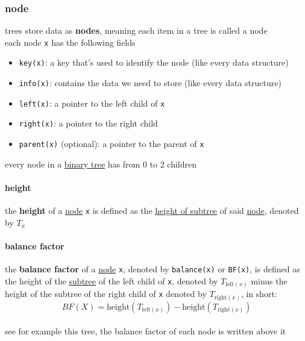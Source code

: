 \documentclass[a4paper,12pt]{article}
\begin{document}
\subsubsection{node}
\label{sec:orgec4976f}
trees store data as \textbf{nodes}, meaning each item in a tree is called a node\\[0pt]
each node \texttt{x} has the following fields\\[0pt]

\begin{itemize}
\item \texttt{key(x)}: a key that's used to identify the node (like every data structure)\\[0pt]
\item \texttt{info(x)}: contains the data we need to store (like every data structure)\\[0pt]
\item \texttt{left(x)}: a pointer to the left child of \texttt{x}\\[0pt]
\item \texttt{right(x)}: a pointer to the right child\\[0pt]
\item \texttt{parent(x)} (optional): a pointer to the parent of \texttt{x}\\[0pt]
\end{itemize}

every node in a \hyperref[sec:org254f5f7]{binary tree} has from 0 to 2 children\\[0pt]
\paragraph{height}
\label{sec:orgb8014c2}
\begin{definition}
the \textbf{height} of a \hyperref[sec:orgec4976f]{node} \texttt{x} is defined as the \hyperref[sec:org2cfcbaa]{height of subtree} of said \hyperref[sec:orgec4976f]{node}, denoted by \(T_x\)\\[0pt]
\end{definition}
\paragraph{balance factor}
\label{sec:org98c9b00}
the \textbf{balance factor} of a \hyperref[sec:orgec4976f]{node} \texttt{x}, denoted by \texttt{balance(x)} or \texttt{BF(x)}, is defined as the height of the \hyperref[sec:orgaaf7b83]{subtree} of the left child of \texttt{x}, denoted by \(T_{\text{left}(x)}\) minus the height of the subtree of the right child of \texttt{x} denoted by \(T_{\text{right}(x)}\), in short:\\[0pt]
\[
  BF(X) = \text{height}(T_{\text{left}(x)}) - \text{height}(T_{\text{right}(x)})
\]\\[0pt]
see for example this tree, the balance factor of each node is written above it\\[0pt]
\end{document}
